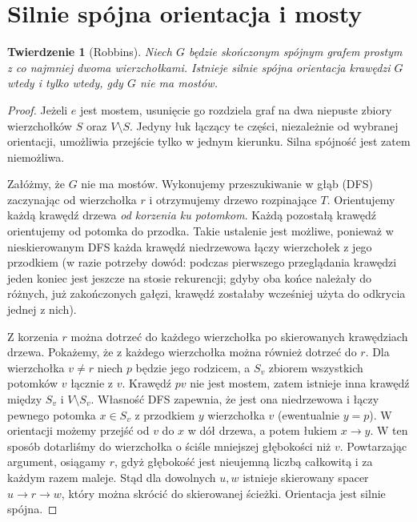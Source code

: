 \documentclass[11pt,a4paper]{report}
\numberwithin{equation}{section}
\theoremstyle{plain}
\newtheorem{twierdzenie}{Twierdzenie}[section]
\theoremstyle{definition}
\theoremstyle{remark}
\begin{document}
\section{Silnie spójna orientacja i mosty}
\label{sec:tg-robbins}

\begin{twierdzenie}[Robbins]
\label{thm:tg-robbins}
Niech $G$ będzie skończonym spójnym grafem prostym
z co najmniej dwoma wierzchołkami. Istnieje silnie spójna
orientacja krawędzi $G$ wtedy i tylko wtedy,
gdy $G$ nie ma mostów.
\end{twierdzenie}

\begin{proof}
Jeżeli $e$ jest mostem, usunięcie go rozdziela graf na dwa
niepuste zbiory wierzchołków $S$ oraz $V\setminus S$.
Jedyny łuk łączący te części, niezależnie od wybranej
orientacji, umożliwia przejście tylko w jednym kierunku.
Silna spójność jest zatem niemożliwa.

Załóżmy, że $G$ nie ma mostów. Wykonujemy przeszukiwanie
w głąb (DFS) zaczynając od wierzchołka $r$ i otrzymujemy
drzewo rozpinające $T$. Orientujemy każdą krawędź drzewa
\emph{od korzenia ku potomkom}. Każdą pozostałą krawędź
orientujemy od potomka do przodka. Takie ustalenie
jest możliwe, ponieważ w nieskierowanym DFS każda
krawędź niedrzewowa łączy wierzchołek z jego przodkiem
(w razie potrzeby dowód: podczas pierwszego przeglądania
krawędzi jeden koniec jest jeszcze na stosie rekurencji;
gdyby oba końce należały do różnych, już zakończonych gałęzi,
krawędź zostałaby wcześniej użyta do odkrycia jednej z nich).

Z korzenia $r$ można dotrzeć do każdego wierzchołka
po skierowanych krawędziach drzewa. Pokażemy, że
z każdego wierzchołka można również dotrzeć do $r$.
Dla wierzchołka $v\ne r$ niech $p$ będzie jego rodzicem,
a $S_v$ zbiorem wszystkich potomków $v$ łącznie z $v$.
Krawędź $pv$ nie jest mostem, zatem istnieje inna krawędź
między $S_v$ i $V\setminus S_v$. Własność DFS zapewnia,
że jest ona niedrzewowa i łączy pewnego potomka $x\in S_v$
z przodkiem $y$ wierzchołka $v$ (ewentualnie $y=p$).
W orientacji możemy przejść od $v$ do $x$ w dół drzewa,
a potem łukiem $x\to y$. W ten sposób dotarliśmy do
wierzchołka o ściśle mniejszej głębokości niż $v$.
Powtarzając argument, osiągamy $r$, gdyż głębokość
jest nieujemną liczbą całkowitą i za każdym razem maleje.
Stąd dla dowolnych $u,w$ istnieje skierowany spacer
$u\to r\to w$, który można skrócić do skierowanej
ścieżki. Orientacja jest silnie spójna.
\end{proof}
\end{document}
